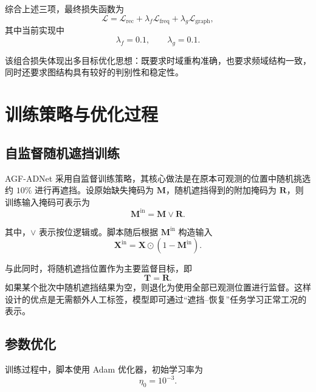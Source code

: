 综合上述三项，最终损失函数为
\begin{equation}
    \mathcal{L}
    =
    \mathcal{L}_{\mathrm{rec}}
    + \lambda_f \mathcal{L}_{\mathrm{freq}}
    + \lambda_g \mathcal{L}_{\mathrm{graph}},
\end{equation}
其中当前实现中
\begin{equation}
    \lambda_f = 0.1, \qquad \lambda_g = 0.1.
\end{equation}

该组合损失体现出多目标优化思想：既要求时域重构准确，也要求频域结构一致，同时还要求图结构具有较好的判别性和稳定性。

\section{训练策略与优化过程}

\subsection{自监督随机遮挡训练}

AGF-ADNet 采用自监督训练策略，其核心做法是在原本可观测的位置中随机挑选约 $10\%$ 进行再遮挡。设原始缺失掩码为 $\mathbf{M}$，随机遮挡得到的附加掩码为 $\mathbf{R}$，则训练输入掩码可表示为
\begin{equation}
    \mathbf{M}^{\mathrm{in}} = \mathbf{M} \lor \mathbf{R}.
\end{equation}

其中，$\lor$ 表示按位逻辑或。脚本随后根据 $\mathbf{M}^{\mathrm{in}}$ 构造输入
\begin{equation}
    \mathbf{X}^{\mathrm{in}} = \mathbf{X} \odot (1-\mathbf{M}^{\mathrm{in}}).
\end{equation}

与此同时，将随机遮挡位置作为主要监督目标，即
\begin{equation}
    \mathbf{T} = \mathbf{R}.
\end{equation}
如果某个批次中随机遮挡结果为空，则退化为使用全部已观测位置进行监督。这样设计的优点是无需额外人工标签，模型即可通过“遮挡--恢复”任务学习正常工况的表示。

\subsection{参数优化}

训练过程中，脚本使用 Adam 优化器，初始学习率为
\begin{equation}
    \eta_0 = 10^{-3}.
\end{equation}

